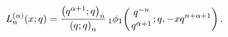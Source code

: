 \[\mathop{L^{(\alpha)}_{n}\/}\nolimits\!\left(x;q\right)=\frac{\left(q^{\alpha+1%
};q\right)_{n}}{\left(q;q\right)_{n}}\mathop{{{}_{1}\phi_{1}}\/}\nolimits\!%
\left({q^{-n}\atop q^{\alpha+1}};q,-xq^{n+\alpha+1}\right).\]